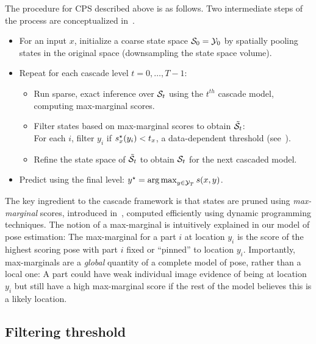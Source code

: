 The procedure for CPS described above is as follows.  Two intermediate steps of the process are conceptualized in~.

\begin{itemize}
\item For an input $x$, initialize a coarse state space $\mathcal{S}_0 = \mathcal{Y}_0$ by 
spatially pooling states in the original space (downsampling the state space 
volume).

\item Repeat for each cascade level $t = 0,\ldots,T-1$:
\begin{itemize}
\item Run sparse, exact inference over  $\mathcal{S}_t$ using the $t^{th}$ cascade 
model, computing max-marginal scores.
\item Filter states based on max-marginal scores to obtain $\tilde{\mathcal{S}}_t$:\\
\indent For each $i$, filter $y_i$ if $s^\star_x(y_i) < t_x$, a data-dependent threshold (see~).

 \item Refine the state space of $\tilde{\mathcal{S}}_t$ to obtain $\mathcal{S}_t$ for 
the next cascaded model.
\end{itemize}
\item Predict using the final level: $y^\star = \mathop{\arg\max}_{y \in \mathcal{Y}_T} s(x,y)$.
\end{itemize}


The key ingredient to the cascade framework is that states are pruned using 
{\em max-marginal} scores, introduced in~, computed 
efficiently using dynamic programming techniques.  The notion of a max-marginal 
is intuitively explained in our model of pose estimation:  The max-marginal for 
a part $i$ at location $y_i$ is the score of the highest scoring pose with part $i$ fixed or ``pinned'' to location $y_i$. Importantly, max-marginals are a {\em 
global} quantity of a complete model of pose, rather than a local one: A part 
could have weak individual image evidence of being at location $y_i$ but still 
have a high max-marginal score if the rest of the model believes this is a 
likely location. 

\subsection{Filtering threshold}\label{sec:cps-thresh}

